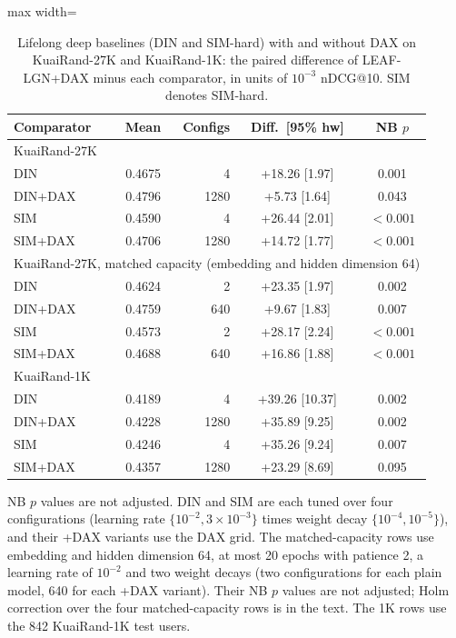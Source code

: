 \documentclass[preprint,12pt,authoryear]{elsarticle}
\begin{document}
\begin{table}[tbp]
\centering
\footnotesize
\caption{Lifelong deep baselines (DIN and SIM-hard) with and without DAX on KuaiRand-27K and KuaiRand-1K: the paired difference of LEAF-LGN+DAX minus each comparator, in units of $10^{-3}$ nDCG@10. SIM denotes SIM-hard.}
\label{tab:deep}
\begin{adjustbox}{max width=\linewidth}
\begin{tabular}{lrrcc}
\toprule
Comparator & Mean & Configs & Diff.\ [95\% hw] & NB $p$ \\
\midrule
\multicolumn{5}{l}{KuaiRand-27K} \\
DIN & 0.4675 & 4 & +18.26 [1.97] & 0.001 \\
DIN+DAX & 0.4796 & 1280 & +5.73 [1.64] & 0.043 \\
SIM & 0.4590 & 4 & +26.44 [2.01] & $<0.001$ \\
SIM+DAX & 0.4706 & 1280 & +14.72 [1.77] & $<0.001$ \\
\midrule
\multicolumn{5}{l}{KuaiRand-27K, matched capacity (embedding and hidden dimension 64)} \\
DIN & 0.4624 & 2 & +23.35 [1.97] & 0.002 \\
DIN+DAX & 0.4759 & 640 & +9.67 [1.83] & 0.007 \\
SIM & 0.4573 & 2 & +28.17 [2.24] & $<0.001$ \\
SIM+DAX & 0.4688 & 640 & +16.86 [1.88] & $<0.001$ \\
\midrule
\multicolumn{5}{l}{KuaiRand-1K} \\
DIN & 0.4189 & 4 & +39.26 [10.37] & 0.002 \\
DIN+DAX & 0.4228 & 1280 & +35.89 [9.25] & 0.002 \\
SIM & 0.4246 & 4 & +35.26 [9.24] & 0.007 \\
SIM+DAX & 0.4357 & 1280 & +23.29 [8.69] & 0.095 \\
\midrule
\bottomrule
\end{tabular}
\end{adjustbox}
\par\smallskip
\begin{minipage}{\linewidth}\raggedright\footnotesize NB $p$ values are not adjusted. DIN and SIM are each tuned over four configurations (learning rate $\{10^{-2},3\times10^{-3}\}$ times weight decay $\{10^{-4},10^{-5}\}$), and their +DAX variants use the DAX grid. The matched-capacity rows use embedding and hidden dimension 64, at most 20 epochs with patience 2, a learning rate of $10^{-2}$ and two weight decays (two configurations for each plain model, 640 for each +DAX variant). Their NB $p$ values are not adjusted; Holm correction over the four matched-capacity rows is in the text. The 1K rows use the 842 KuaiRand-1K test users.\end{minipage}
\end{table}
\end{document}
